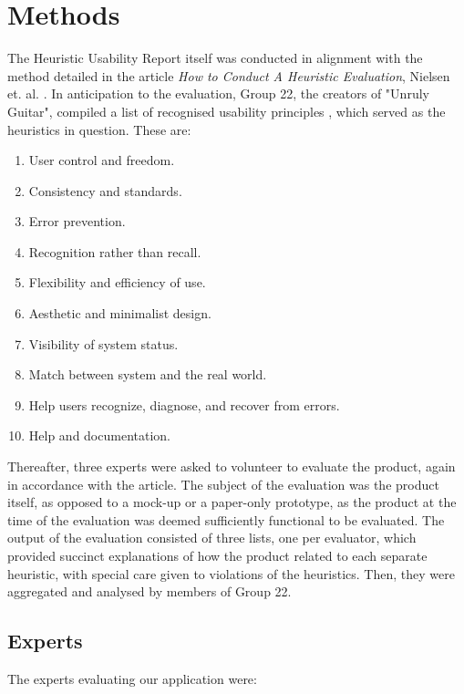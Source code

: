 \section{Methods}

The Heuristic Usability Report itself was conducted in alignment with the method detailed in the article \emph{How to Conduct A Heuristic Evaluation}, Nielsen et. al. \cite{how-to-coduct-a-heuristic-evaluation}. In anticipation to the evaluation, Group 22, the creators of "Unruly Guitar", compiled a list of recognised usability principles \cite{list-of-heuristics}, which served as the heuristics in question. These are:

\begin{enumerate}
    \item User control and freedom.
    \item Consistency and standards.
    \item Error prevention.
    \item Recognition rather than recall.
    \item Flexibility and efficiency of use.
    \item Aesthetic and minimalist design.
    \item Visibility of system status.
    \item Match between system and the real world.
    \item Help users recognize, diagnose, and recover from errors.
    \item Help and documentation.
\end{enumerate}

Thereafter, three experts were asked to volunteer to evaluate the product, again in accordance with the article. The subject of the evaluation was the product itself, as opposed to a mock-up or a paper-only prototype, as the product at the time of the evaluation was deemed sufficiently functional to be evaluated. The output of the evaluation consisted of three lists, one per evaluator, which provided succinct explanations of how the product related to each separate heuristic, with special care given to violations of the heuristics. Then, they were aggregated and analysed by members of Group 22.

\subsection{Experts}

The experts evaluating our application were:

